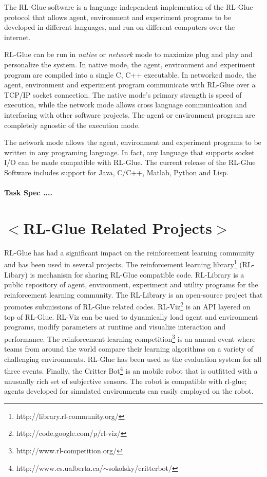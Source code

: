 \documentclass[twopage,11pt]{article}
\begin{document}
The RL-Glue software is a language independent implemention of the RL-Glue protocol  that allows agent, environment and experiment programs to be developed in different languages, and run on different computers over the internet. 

RL-Glue can be run in {\it native} or {\it network} mode to maximize plug and play and personalize the system. In native mode, the agent, environment and experiment program are compiled into a single C, C++ executable. In networked mode, the agent, environment and experiment program communicate with RL-Glue over a TCP/IP socket connection. The native mode's primary strength is speed of execution, while the network mode allows cross language communication and interfacing with other software projects. The agent or environment program are completely agnostic of the execution mode.       

The network mode allows the agent, environment and experiment programs to be written in any programing language. In fact, any language that supports socket I/O can be made compatible with RL-Glue. The current release of the RL-Glue Software includes support for Java, C/C++, Matlab, Python and Lisp.  
\\\\
{\bf Task Spec ....}



\section{$<$RL-Glue Related Projects$>$}
RL-Glue has had a significant impact on the reinforcement learning community and has been used in several projects. The reinforcement learning library\footnote{http://library.rl-community.org/} (RL-Libary) is mechanism for sharing RL-Glue compatible code. RL-Library is a public repository of agent, environment, experiment and utility programs for the reinforcement learning community. The RL-Library is an open-source project that promotes submissions of RL-Glue related codes. RL-Viz\footnote{http://code.google.com/p/rl-viz/} is an API layered on top of RL-Glue. RL-Viz can be used to dynamically load agent and environment programs, modify parameters at runtime and visualize interaction and performance.  The reinforcement learning competition\footnote{http://www.rl-competition.org/} is an annual event where teams from around the world compare their learning algorithms on a variety of challenging environments. RL-Glue has been used as the evaluation system for all three events. Finally, the Critter Bot\footnote{http://www.cs.ualberta.ca/$\sim$sokolsky/critterbot/} is an mobile robot that is outfitted with a unusually rich set of subjective sensors. The robot is compatible with rl-glue; agents developed for simulated environments can easily employed on the robot.
\end{document}
